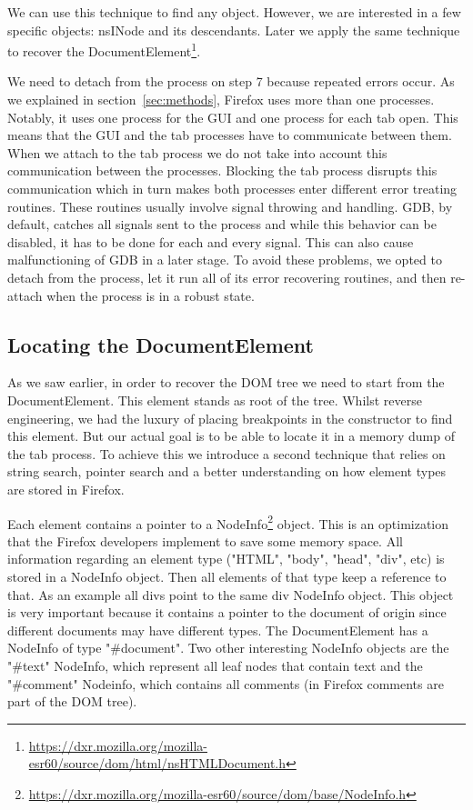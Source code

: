 We can use this technique to find any object. However, we are
interested in a few specific objects: nsINode and its
descendants. Later we apply the same technique to recover the
DocumentElement\footnote{\url{https://dxr.mozilla.org/mozilla-esr60/source/dom/html/nsHTMLDocument.h}}.

We need to detach from the process on step 7 because repeated
errors occur. As we explained in section~\ref{sec:methods}, Firefox uses more
than one processes. Notably, it uses one process for the GUI and one
process for each tab open. This means that the GUI and the tab
processes have to communicate between them. When we attach to the tab
process we do not take into account this communication between the
processes. Blocking the tab process disrupts this communication which
in turn makes both processes enter different error treating
routines. These routines usually involve signal throwing and
handling. GDB, by default, catches all signals sent to the process and
while this behavior can be disabled, it has to be done for each and
every signal. This can also cause malfunctioning of GDB in a later
stage. To avoid these problems, we opted to detach from the
process, let it run all of its error recovering routines, and then
re-attach when the process is in a robust state.

\subsection{Locating the DocumentElement}
As we saw earlier, in order to recover the DOM tree we need to start
from the DocumentElement. This element stands as root of the
tree. Whilst reverse engineering, we had the luxury of placing
breakpoints in the constructor to find this element. But our actual
goal is to be able to locate it in a memory dump of the tab
process. To achieve this we introduce a second technique that relies
on string search, pointer search and a better understanding on how
element types are stored in Firefox.

Each element contains a pointer to a
NodeInfo\footnote{\url{https://dxr.mozilla.org/mozilla-esr60/source/dom/base/NodeInfo.h}}
object. This is an optimization that the Firefox developers implement
to save some memory space. All information regarding an element type
("HTML", "body", "head", "div", etc) is stored in a NodeInfo
object. Then all elements of that type keep a reference to that. As an
example all divs point to the same div NodeInfo object. This object is
very important because it contains a pointer to the document of origin
since different documents may have different types. The
DocumentElement has a NodeInfo of type "\#document". Two other
interesting NodeInfo objects are the "\#text" NodeInfo, which
represent all leaf nodes that contain text and the "\#comment"
Nodeinfo, which contains all comments (in Firefox comments are part of
the DOM tree).

